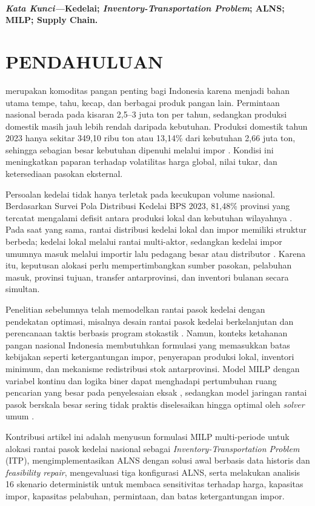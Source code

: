 \documentclass[journal]{IEEEtran}
\theoremstyle{definition}
\theoremstyle{definition}
\theoremstyle{plain}
\newcommand{\katakunci}[1]{%
    \noindent\\
    \textit{\textbf{Kata Kunci---}}{\textbf{#1}}
}
\begin{document}
    \katakunci{\small Kedelai; \textit{Inventory-Transportation Problem}; ALNS; MILP; Supply Chain.}

    \IEEEpeerreviewmaketitle

     \section{PENDAHULUAN}
     \normalsize {} merupakan komoditas pangan penting bagi Indonesia karena menjadi bahan utama tempe, tahu, kecap, dan berbagai produk pangan lain. Permintaan nasional berada pada kisaran 2,5--3 juta ton per tahun, sedangkan produksi domestik masih jauh lebih rendah daripada kebutuhan. Produksi domestik tahun 2023 hanya sekitar 349,10 ribu ton atau 13,14\% dari kebutuhan 2,66 juta ton, sehingga sebagian besar kebutuhan dipenuhi melalui impor \cite{kementan2024kedelai,pusdatin2024konsumsi}. Kondisi ini meningkatkan paparan terhadap volatilitas harga global, nilai tukar, dan ketersediaan pasokan eksternal.

     Persoalan kedelai tidak hanya terletak pada kecukupan volume nasional. Berdasarkan Survei Pola Distribusi Kedelai BPS 2023, 81,48\% provinsi yang tercatat mengalami defisit antara produksi lokal dan kebutuhan wilayahnya \cite{bps2023distribusi}. Pada saat yang sama, rantai distribusi kedelai lokal dan impor memiliki struktur berbeda; kedelai lokal melalui rantai multi-aktor, sedangkan kedelai impor umumnya masuk melalui importir lalu pedagang besar atau distributor \cite{cips2023logistics}. Karena itu, keputusan alokasi perlu mempertimbangkan sumber pasokan, pelabuhan masuk, provinsi tujuan, transfer antarprovinsi, dan inventori bulanan secara simultan.

     Penelitian sebelumnya telah memodelkan rantai pasok kedelai dengan pendekatan optimasi, misalnya desain rantai pasok kedelai berkelanjutan dan perencanaan taktis berbasis program stokastik \cite{SHARIFI2023,reis2023stochastic}. Namun, konteks ketahanan pangan nasional Indonesia membutuhkan formulasi yang memasukkan batas kebijakan seperti ketergantungan impor, penyerapan produksi lokal, inventori minimum, dan mekanisme redistribusi stok antarprovinsi. Model MILP dengan variabel kontinu dan logika biner dapat menghadapi pertumbuhan ruang pencarian yang besar pada penyelesaian eksak \cite{ntnu_milp}, sedangkan model jaringan rantai pasok berskala besar sering tidak praktis diselesaikan hingga optimal oleh \textit{solver} umum \cite{ESKANDARPOUR2017lns_supply}.

     Kontribusi artikel ini adalah menyusun formulasi MILP multi-periode untuk alokasi rantai pasok kedelai nasional sebagai \textit{Inventory-Transportation Problem} (ITP), mengimplementasikan ALNS dengan solusi awal berbasis data historis dan \textit{feasibility repair}, mengevaluasi tiga konfigurasi ALNS, serta melakukan analisis 16 skenario deterministik untuk membaca sensitivitas terhadap harga, kapasitas impor, kapasitas pelabuhan, permintaan, dan batas ketergantungan impor.
\end{document}
